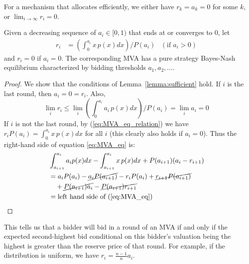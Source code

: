 
For a mechanism that allocates efficiently, we either have $r_k = a_k = 0$
for some $k$, or $\lim_{i \rightarrow \infty} r_i = 0$.

\begin{theorem}
Given a decreasing sequence of $a_i \in [0,1)$ that ends at or converges to
$0$, let
\begin{align}\label{eq:MVA_eq_relation}
  r_i &= \left( \int_{0}^{a_i} x \, p(x) dx \right) / P(a_i) & (\mbox{if $a_i > 0$})
\end{align}
and $r_i=0$ if $a_i=0$. The corresponding MVA has a pure strategy Bayes-Nash equilibrium characterized by
bidding thresholds $a_1, a_2, \ldots$.
\end{theorem}

\begin{proof}
We show that the conditions of Lemma~\ref{lemma:sufficient} hold.  If $i$
is the last round, then $a_i=0=r_i$.  Also, $$\lim_i r_i \leq \lim_i
\left( \int_{0}^{a_i} a_i \, p(x) dx \right) / P(a_i) = \lim_i a_i = 0$$
If $i$ is not the last round, 
by (\ref{eq:MVA_eq_relation}) we have $r_i P(a_i) = \int_{0}^{a_i}
x\,p(x)dx$ for all $i$ (this clearly also holds if
$a_i = 0$). Thus the right-hand side of equation \ref{eq:MVA_eq} is:
\begin{align*}
	& \int_{a_{i+1}}^{a_i} a_i p(x) dx - \int_{a_{i+1}}^{a_i} x \, p(x) dx + P(a_{i+1})(a_i-r_{i+1}) \\
	&= a_i P(a_i) - \cancel{a_i P(a_{i+1})} - r_i P(a_i) + \cancel{r_{i+1} P(a_{i+1})} \\
		& ~~~ + \cancel{P(a_{i+1}) a_i} - \cancel{P(a_{i+1}) r_{i+1}}\\
	&= \mbox{left hand side of (\ref{eq:MVA_eq})}
\end{align*}
\end{proof}

This tells us that a bidder will bid in a round of an MVA if and only if
the expected second-highest bid conditional on this bidder's valuation
being the highest is greater than the reserve price of that round. For
example, if the distribution is uniform, we have $r_i = \frac{n-1}{n}
a_i$. 


